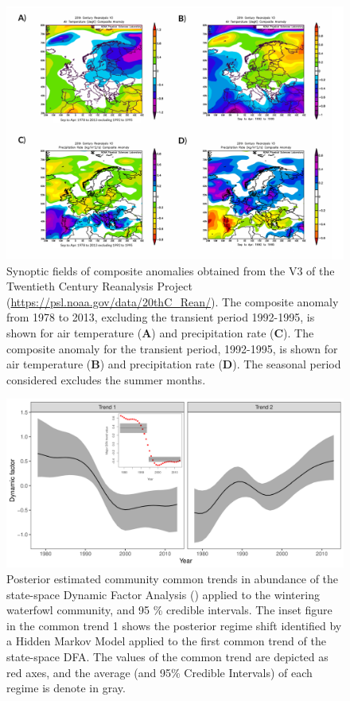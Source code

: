 \documentclass[12pt]{article}
\begin{document}
	\begin{figure}[t]
		\centering
		\includegraphics[width=\linewidth]{processed_figs/NOAA_CAR.pdf}
		\caption[Synoptic fields of composite anomalies obtained from the V3 of the Twentieth Century Reanalysis Project]{Synoptic fields of composite anomalies obtained from the V3 of the Twentieth Century Reanalysis Project (\url{https://psl.noaa.gov/data/20thC_Rean/}). The composite anomaly from 1978 to 2013, excluding the transient period 1992-1995, is shown for air temperature (\textbf{A}) and precipitation rate (\textbf{C}). The composite anomaly for the transient period, 1992-1995, is shown for air temperature (\textbf{B}) and precipitation rate (\textbf{D}). The seasonal period considered excludes the summer months. }
		\label{fig:CRP_NASA_V3}
	\end{figure}
	
	\begin{figure}[t]
		\centering
		\includegraphics[width=1\linewidth]{processed_figs/Common_Trends}
		\caption[Posterior estimated community common DFA trends]{Posterior estimated community common trends in abundance of the state-space Dynamic Factor Analysis (\cite{Ward2022}) applied to the wintering waterfowl community, and 95 \% credible intervals. The inset figure in the common trend 1 shows the posterior regime shift identified by a Hidden Markov Model applied to the first common trend of the state-space DFA. The values of the common trend are depicted as red axes, and the average (and 95\% Credible Intervals) of each regime is denote in gray.}
		\label{fig:Common_Trends}
	\end{figure}
	
\end{document}
